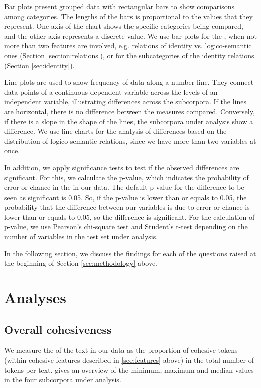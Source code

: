 \documentclass[output=paper]{langsci/langscibook.cls}
\begin{document}
Bar plots present grouped data with rectangular bars to show comparisons among categories. The lengths of the bars is proportional to the values that they represent. One axis of the chart shows the specific categories being compared, and the other axis represents a discrete value. We use bar plots for the , when not more than two features are involved, e.g. relations of identity vs. logico-semantic ones (Section \ref{section:relations}), or for the subcategories of the identity relations (Section \ref{sec:identity}).

Line plots are used to show frequency of data along a number line. They connect data points of a continuous dependent variable across the levels of an independent variable, illustrating differences across the subcorpora. If the lines are horizontal, there is no difference between the measures compared. Conversely, if there is a slope in the shape of the lines, the subcorpora under analysis show a difference. We use line charts for the analysis of differences based on the distribution of logico-semantic relations, since we have more than two variables at once.

In addition, we apply significance tests to test if the observed differences are significant. For this, we calculate the {\sc p-value}, which indicates the probability of error or chance in the  in our data. The default p-value for the difference to be seen as significant is 0.05. So, if the p-value is lower than or equals to 0.05, the probability that the difference between our variables is due to error or chance is lower than or equals to 0.05, so the difference is significant. For the calculation of p-value, we use Pearson's chi-square test and Student's t-test \citep{Baayen2008} depending on the number of variables in the test set under analysis.

In the following section, we discuss the findings for each of the questions raised at the beginning of Section \ref{sec:methodology} above.

\section{Analyses}\label{sec:analyses}

\subsection{Overall cohesiveness}\label{sec:cohesiveness}

We measure the  of the text in our data as the proportion of cohesive tokens (within cohesive features described in \ref{sec:features} above) in the total number of tokens per text.  gives an overview of the minimum, maximum and median values in the four subcorpora under analysis. 
\end{document}

